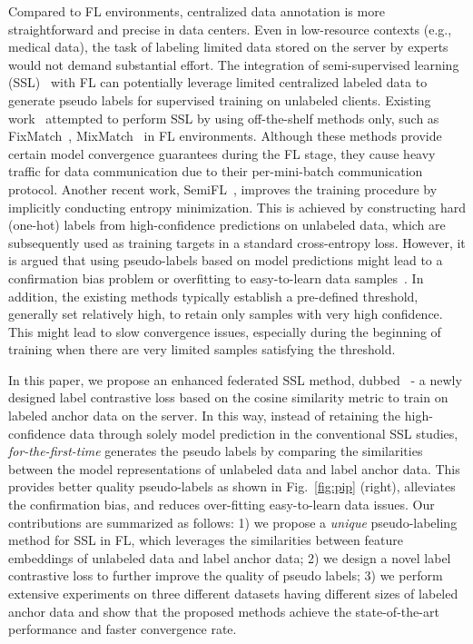 \documentclass[withindex,glossary]{cam-thesis}
\begin{document}
Compared to FL environments, centralized data annotation is more straightforward and precise in data centers. Even in low-resource contexts (e.g., medical data), the task of labeling limited data stored on the server by experts would not demand substantial effort. The integration of semi-supervised learning (SSL)~\citep{chapelle2009semi, yang2022survey,fixmatch,mixmatch} with FL can potentially leverage limited centralized labeled data to generate pseudo labels for supervised training on unlabeled clients. Existing work~\citep{jeong2020federated,zhang2021improving} attempted to perform SSL by using off-the-shelf methods only, such as FixMatch~\citep{fixmatch}, MixMatch~\citep{mixmatch} in FL environments. Although these methods provide certain model convergence guarantees during the FL stage, they cause heavy traffic for data communication due to their per-mini-batch communication protocol. Another recent work, SemiFL~\citep{semifl}, improves the training procedure by implicitly conducting entropy minimization. This is achieved by constructing hard (one-hot) labels from high-confidence predictions on unlabeled data, which are subsequently used as training targets in a standard cross-entropy loss. However, it is argued that using pseudo-labels based on model predictions might lead to a confirmation bias problem or overfitting to easy-to-learn data samples~\citep{nguyen2023boosting}. In addition, the existing methods typically establish a pre-defined threshold, generally set relatively high, to retain only samples with very high confidence.
This might lead to slow convergence issues, especially during the beginning of training when there are very limited samples satisfying the threshold.

In this paper, we propose an enhanced federated SSL method, dubbed \method ~- a newly designed label contrastive loss based on the cosine similarity metric to train on labeled anchor data on the server.
In this way, instead of retaining the high-confidence data through solely model prediction in the conventional SSL studies, \method \textit{for-the-first-time} generates the pseudo labels by comparing the similarities between the model representations of unlabeled data and label anchor data. This provides better quality pseudo-labels as shown in Fig.~\ref{fig:pip} (right), alleviates the confirmation bias, and reduces over-fitting easy-to-learn data issues. Our contributions are summarized as follows: 1) we propose a \textit{unique} pseudo-labeling method \method for SSL in FL, which leverages the similarities between feature embeddings of unlabeled data and label anchor data; 2) we design a novel label contrastive loss to further improve the quality of pseudo labels; 3) we perform extensive experiments on three different datasets having different sizes of labeled anchor data and show that the proposed methods achieve the state-of-the-art performance and faster convergence rate.
\end{document}
